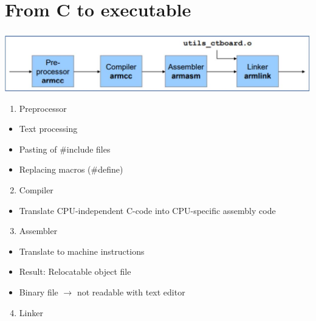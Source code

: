 \documentclass[10pt]{article}
\begin{document}
\section*{From C to executable}
\begin{center}
\includegraphics[width=\linewidth]{images/2024_12_29_79e6b22f503fb7b4f718g-01}
\end{center}

\begin{enumerate}
  \item Preprocessor
\end{enumerate}

\begin{itemize}
  \item Text processing
  \item Pasting of \#include files
  \item Replacing macros (\#define)
\end{itemize}

\begin{enumerate}
  \setcounter{enumi}{1}
  \item Compiler
\end{enumerate}

\begin{itemize}
  \item Translate CPU-independent C-code into CPU-specific assembly code
\end{itemize}

\begin{enumerate}
  \setcounter{enumi}{2}
  \item Assembler
\end{enumerate}

\begin{itemize}
  \item Translate to machine instructions
  \item Result: Relocatable object file
  \item Binary file $\rightarrow$ not readable with text editor
\end{itemize}

\begin{enumerate}
  \setcounter{enumi}{3}
  \item Linker
\end{enumerate}
\end{document}
